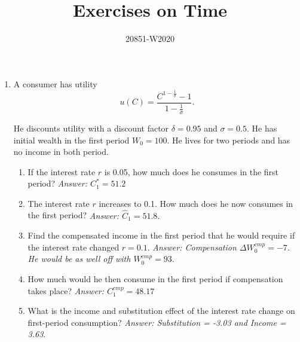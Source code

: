 \documentclass[11pt, oneside,french]{article}   	%
\title{Exercises on Time}
\author{20851-W2020}
\date{}							%
\begin{document}
\maketitle

\begin{enumerate}
    \item A consumer has utility $$u(C) = \frac{C^{1-\tfrac{1}{\sigma}}-1}{1-\tfrac{1}{\sigma}}.$$ 
    
    He discounts utility with a discount factor $\delta=0.95$ and $\sigma=0.5$. He has initial wealth in the first period $W_0=100$. He lives for two periods and has no income in both period. 
    
    \begin{enumerate} 
    \item If the interest rate $r$ is 0.05, how much does he consumes in the first period? \textit{Answer: $C_1^* = 51.2$}
    \item The interest rate $r$ increases to 0.1. How much does he now consumes in the first period? \textit{Answer: $\hat C_1 = 51.8$. }
    \item Find the compensated income in the first period that he would require if the interest rate changed $r=0.1$. \textit{Answer: Compensation $\Delta W^{cmp}_0 = -7$. He would be as well off with $W^{cmp}_0 = 93$}. 
    \item How much would he then consume in the first period if compensation takes place? \textit{Answer: $C^{cmp}_1 = 48.17$}
    \item What is the income and substitution effect of the interest rate change on first-period consumption? \textit{Answer: Substitution = -3.03 and Income = 3.63}. 
    \end{enumerate}


\end{enumerate}
\end{document}
